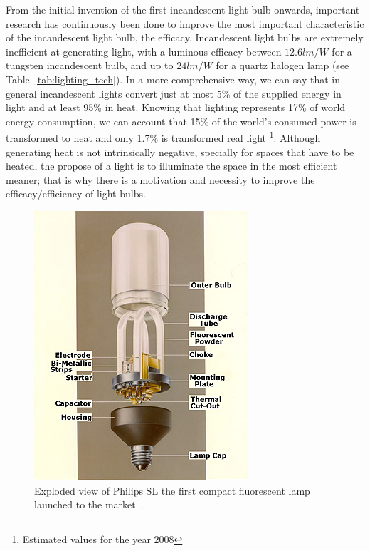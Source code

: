 From the initial invention of the first incandescent light bulb onwards, important research has continuously been done to improve the most important characteristic of the incandescent light bulb, the efficacy. Incandescent light bulbs are extremely inefficient at generating light, with a luminous efficacy between $12.6 lm/W$ for a tungsten incandescent bulb, and  up to $24 lm/W$ for a quartz halogen lamp (see Table~\ref{tab:lighting_tech}). In a more comprehensive way, we can say that in general incandescent lights convert just at most 5\% of the supplied energy in light and at least 95\% in heat. Knowing that lighting represents 17\% of world energy consumption, we can account that 15\% of the world's consumed power is transformed to heat and only 1.7\% is transformed real light \footnote{Estimated values for the year 2008}. Although generating heat is not intrinsically negative, specially for spaces that have to be heated, the propose of a light is to illuminate the space in the most efficient meaner; that is why there is a motivation and necessity to improve the efficacy/efficiency of light bulbs.

\begin{figure}
\centering
\includegraphics{./0_intro/img/phil1b.jpg}
\caption[Compact fluorescent lamp]{Exploded view of Philips SL the first compact fluorescent lamp launched to the market~\cite{lib:Philips}.}
\label{fig:philips_sl}
\end{figure}

